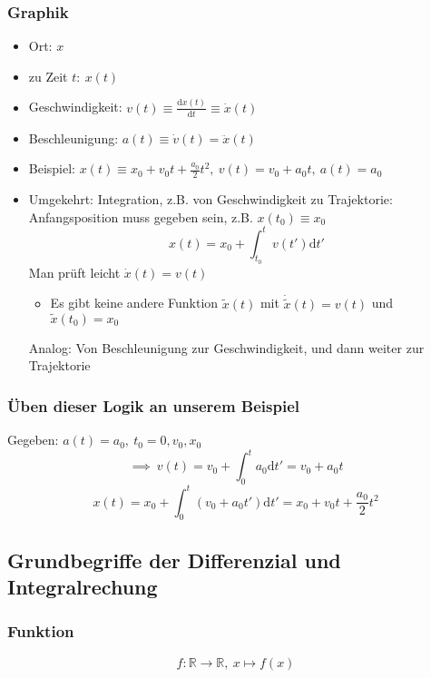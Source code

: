\documentclass[a4paper]{scrartcl}
\theoremstyle{definition}
\theoremstyle{plain}
\theoremstyle{remark}
\theoremstyle{remark}
\begin{document}
\subsubsection{Graphik}
\label{sec-2-1-1}
\begin{itemize}
\item Ort: $x$
\item zu Zeit $t:~x(t)$
\item Geschwindigkeit: $v(t) \equiv \frac{\mathrm{d}x(t)}{\mathrm{d}t} \equiv \dot{x}(t)$
\item Beschleunigung: $a(t) \equiv \dot{v}(t) = \ddot{x}(t)$
\item Beispiel: $x(t) \equiv x_0 + v_0 t + \frac{a_0}{2}t^2, ~v(t) = v_0 + a_0 t,~a(t) = a_0$
\item Umgekehrt: Integration, z.B. von Geschwindigkeit zu Trajektorie: Anfangsposition muss gegeben sein, z.B. $x(t_0) \equiv x_0$
     \[x(t)=x_0 + \int_{t_0}^{t}v(t')\mathrm{d}t'\]
     Man prüft leicht $\dot{x}(t) = v(t)$
\begin{itemize}
\item Es gibt keine andere Funktion $\tilde{x}(t)$ mit $\dot{\tilde{x}}(t) = v(t)$ und $\tilde{x}(t_0) = x_0$
\end{itemize}
Analog: Von Beschleunigung zur Geschwindigkeit, und dann weiter zur Trajektorie
\end{itemize}
\subsubsection{Üben dieser Logik an unserem Beispiel}
\label{sec-2-1-2}
Gegeben: $a(t) = a_0,~t_0=0,v_0,x_0$ \\
    \[\implies~v(t) = v_0 + \int_0^t a_0\mathrm{d}t' = v_0 + a_0 t\]
\[x(t) = x_0 + \int_0^t (v_0 + a_0 t')\mathrm{d}t' = x_0 + v_0 t + \frac{a_0}{2}t^2\]
\subsection{Grundbegriffe der Differenzial und Integralrechung}
\label{sec-2-2}
\subsubsection{Funktion}
\label{sec-2-2-1}
\[f: \mathbb{R} \rightarrow \mathbb{R},~x \mapsto f(x)\]
\end{document}
